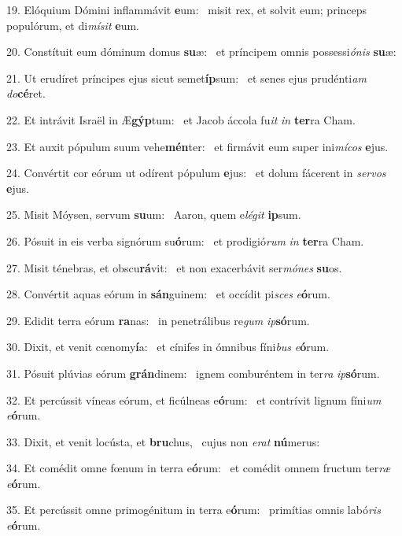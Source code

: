 19. Elóquium Dómini inflammávit \textbf{e}um: \ast\  misit rex, et solvit eum; princeps populórum, et di\textit{mí}\textit{sit} \textbf{e}um.\

20. Constítuit eum dóminum domus \textbf{su}æ: \ast\  et príncipem omnis possessi\textit{ó}\textit{nis} \textbf{su}æ:\

21. Ut erudíret príncipes ejus sicut semet\textbf{íp}sum: \ast\  et senes ejus prudénti\textit{am} \textit{do}\textbf{cé}ret.\

22. Et intrávit Israël in Æ\textbf{gýp}tum: \ast\  et Jacob áccola fu\textit{it} \textit{in} \textbf{ter}ra Cham.\

23. Et auxit pópulum suum vehe\textbf{mén}ter: \ast\  et firmávit eum super ini\textit{mí}\textit{cos} \textbf{e}jus.\

24. Convértit cor eórum ut odírent pópulum \textbf{e}jus: \ast\  et dolum fácerent in \textit{ser}\textit{vos} \textbf{e}jus.\

25. Misit Móysen, servum \textbf{su}um: \ast\  Aaron, quem e\textit{lé}\textit{git} \textbf{ip}sum.\

26. Pósuit in eis verba signórum su\textbf{ó}rum: \ast\  et prodigió\textit{rum} \textit{in} \textbf{ter}ra Cham.\

27. Misit ténebras, et obscu\textbf{rá}vit: \ast\  et non exacerbávit ser\textit{mó}\textit{nes} \textbf{su}os.\

28. Convértit aquas eórum in \textbf{sán}guinem: \ast\  et occídit pi\textit{sces} \textit{e}\textbf{ó}rum.\

29. Edidit terra eórum \textbf{ra}nas: \ast\  in penetrálibus re\textit{gum} \textit{ip}\textbf{só}rum.\

30. Dixit, et venit cœnomy\textbf{í}a: \ast\  et cínifes in ómnibus fíni\textit{bus} \textit{e}\textbf{ó}rum.\

31. Pósuit plúvias eórum \textbf{grán}dinem: \ast\  ignem comburéntem in ter\textit{ra} \textit{ip}\textbf{só}rum.\

32. Et percússit víneas eórum, et ficúlneas e\textbf{ó}rum: \ast\  et contrívit lignum fíni\textit{um} \textit{e}\textbf{ó}rum.\

33. Dixit, et venit locústa, et \textbf{bru}chus, \ast\  cujus non \textit{e}\textit{rat} \textbf{nú}merus:\

34. Et comédit omne fœnum in terra e\textbf{ó}rum: \ast\  et comédit omnem fructum ter\textit{ræ} \textit{e}\textbf{ó}rum.\

35. Et percússit omne primogénitum in terra e\textbf{ó}rum: \ast\  primítias omnis labó\textit{ris} \textit{e}\textbf{ó}rum.\

